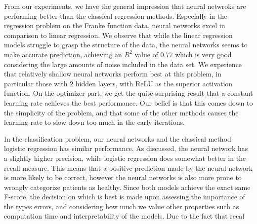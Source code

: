From our experiments, we have the general impression that neural netwroks are performing better than the classical regression methods.
Especially in the regression problem on the Franke function data, neural networks excel in comparison to linear regression.
We observe that while the linear regression models struggle to grasp the structure of the data, the neural networks seems to make accurate prediction, achieving an $R^2$ value of 0.77 which is very good considering the large amounts of noise included in the data set.
We experience that relatively shallow neural networks perform best at this problem, in particular those with 2 hidden layers, with ReLU as the superior activation function.
On the optimizer part, we get the quite surprising result that a constant learning rate achieves the best performance.
Our belief is that this comes down to the simplicity of the problem, and that some of the other methods causes the learning rate to slow down too much in the early iterations.

In the classification problem, our neural networks and the classical method logistic regression has similar performance.
As discussed, the neural network has a slightly higher precision, while logistic regression does somewhat better in the recall measure.
This means that a positive prediction made by the neural network is more likely to be correct, however the neural networks is also more prone to wrongly categorize patients as healthy.
Since both models achieve the exact same F-score, the decision on which is best is made upon assessing the importance of the types errors, and considering how much we value other properties such as computation time and interpretability of the models.
Due to the fact that recal